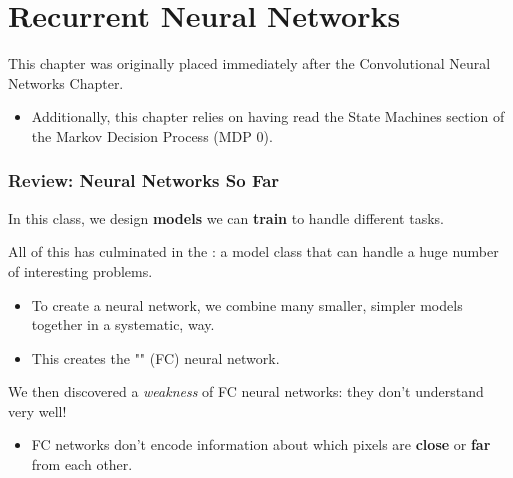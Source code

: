 

\setcounter{chapter}{10-1} %

\chapter{Recurrent Neural Networks}

    This chapter was originally placed immediately after the Convolutional Neural Networks Chapter.

    \begin{itemize}
        \item Additionally, this chapter relies on having read the State Machines section of the Markov Decision Process (MDP 0).
    \end{itemize}

    \subsection{Review: Neural Networks So Far}

        In this class, we design \textbf{models} we can \textbf{train} to handle different tasks.
        
        All of this has culminated in the : a model class that can handle a huge number of interesting problems.
        
            \begin{itemize}
                \item To create a neural network, we combine many smaller, simpler models together in a systematic,  way.

                \item This creates the "" (FC) neural network.
            \end{itemize}
        
        We then discovered a \textit{weakness} of FC neural networks: they don't understand  very well! 
            \begin{itemize}
                \item \miniex FC networks don't encode information about which pixels are \textbf{close} or \textbf{far} from each other.
            \end{itemize}
            
